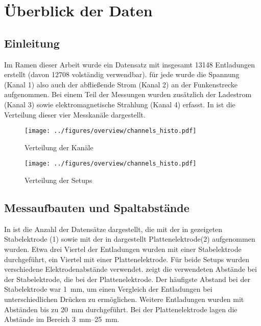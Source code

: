 \chapter{Überblick der Daten}
\label{chap:overview}

\section{Einleitung}
\label{sec:overview}
Im Ramen dieser Arbeit wurde ein Datensatz mit insgesamt 13148 Entladungen erstellt (davon 12708 volständig verwendbar). für jede wurde die Spannung (Kanal 1) also auch der abfließende Strom (Kanal 2) an der Funkenstrecke aufgenommen. Bei einem Teil der Messungen wurden zusätzlich der Ladestrom (Kanal 3) sowie elektromagnetische Strahlung (Kanal 4) erfasst. In  ist die Verteilung dieser vier Messkanäle dargestellt.

\begin{figure}[htbp]
    \centering
    \begin{minipage}[t]{0.47\textwidth}
      \centering
      \texttt{[image: ../figures/overview/channels\_histo.pdf]}
      \caption{Verteilung der Kanäle}
      \label{fig:histogram-channels}
   \end{minipage}
 \begin{minipage}[t]{0.47\textwidth}
      \centering
      \texttt{[image: ../figures/overview/channels\_histo.pdf]}
      \caption{Verteilung der Setups}
      \label{fig:histogram-setup}
  \end{minipage}
\end{figure}


\section{Messaufbauten und Spaltabstände}

In  ist die Anzahl der Datensätze dargestellt, die mit der in  gezeigeten Stabelektrode (1) sowie mit der in  dargestellt Plattenelektrode(2) aufgenommen wurden. Etwa drei Viertel der Entladungen wurden mit einer Stabelektrode durchgeführt, ein Viertel mit einer Plattenelektrode. 
Für beide Setups wurden verschiedene Elektrodenabstände verwendet.  zeigt die verwendeten Abstände bei der Stabelektrode,  die bei der Plattenelektrode. Der häufigste Abstand bei der Stabelektrode war \SI{1}{\milli\metre}, um einen Vergleich der Entladungen bei unterschiedlichen Drücken zu ermöglichen. Weitere Entladungen wurden mit Abständen bis zu \SI{20}{\milli\metre} durchgeführt. Bei der Plattenelektrode lagen die Abstände im Bereich \SIrange{3}{25}{\milli\metre}. 

